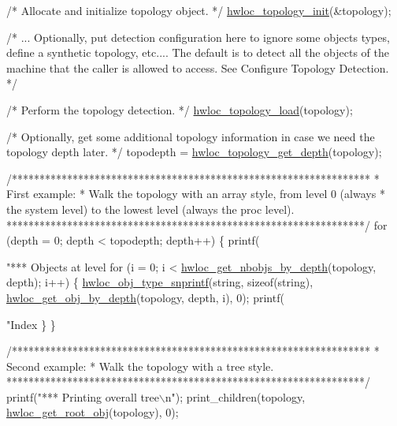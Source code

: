 \begin{DoxyCodeInclude}
{{{    \textcolor{comment}{/* Allocate and initialize topology object. */}
    \hyperlink{a00186_ga03fd4a16d8b9ee1ffc32b25fd2f6bdfa}{hwloc\_topology\_init}(&topology);

    \textcolor{comment}{/* ... Optionally, put detection configuration here to ignore}
\textcolor{comment}{       some objects types, define a synthetic topology, etc....}
\textcolor{comment}{}
\textcolor{comment}{       The default is to detect all the objects of the machine that}
\textcolor{comment}{       the caller is allowed to access.  See Configure Topology}
\textcolor{comment}{       Detection. */}

    \textcolor{comment}{/* Perform the topology detection. */}
    \hyperlink{a00186_gabdf58d87ad77f6615fccdfe0535ff826}{hwloc\_topology\_load}(topology);

    \textcolor{comment}{/* Optionally, get some additional topology information}
\textcolor{comment}{       in case we need the topology depth later. */}
    topodepth = \hyperlink{a00187_gae54d1782ca9b54bea915f5c18a9158fa}{hwloc\_topology\_get\_depth}(topology);

    \textcolor{comment}{/*****************************************************************}
\textcolor{comment}{     * First example:}
\textcolor{comment}{     * Walk the topology with an array style, from level 0 (always}
\textcolor{comment}{     * the system level) to the lowest level (always the proc level).}
\textcolor{comment}{     *****************************************************************/}
    \textcolor{keywordflow}{for} (depth = 0; depth < topodepth; depth++) \{
        printf(\textcolor{stringliteral}{"*** Objects at level %
        \textcolor{keywordflow}{for} (i = 0; i < \hyperlink{a00187_ga1d5ceafe8130fe6e8657bf0bc666ba50}{hwloc\_get\_nbobjs\_by\_depth}(topology, depth);
             i++) \{
            \hyperlink{a00188_gadb8765c260edea80c52cd06a76639ba4}{hwloc\_obj\_type\_snprintf}(\textcolor{keywordtype}{string}, \textcolor{keyword}{sizeof}(\textcolor{keywordtype}{string}),
                                    \hyperlink{a00187_ga391f6b2613f0065673eaa4069b93d4e0}{hwloc\_get\_obj\_by\_depth}(topology, depth, i), 0);
            printf(\textcolor{stringliteral}{"Index %
        \}
    \}

    \textcolor{comment}{/*****************************************************************}
\textcolor{comment}{     * Second example:}
\textcolor{comment}{     * Walk the topology with a tree style.}
\textcolor{comment}{     *****************************************************************/}
    printf(\textcolor{stringliteral}{"*** Printing overall tree\(\backslash\)n"});
    print\_children(topology, \hyperlink{a00187_ga2d4b12fc187dfc53b35f2fa21d21044d}{hwloc\_get\_root\_obj}(topology), 0);

}}}}}
\end{DoxyCodeInclude}

